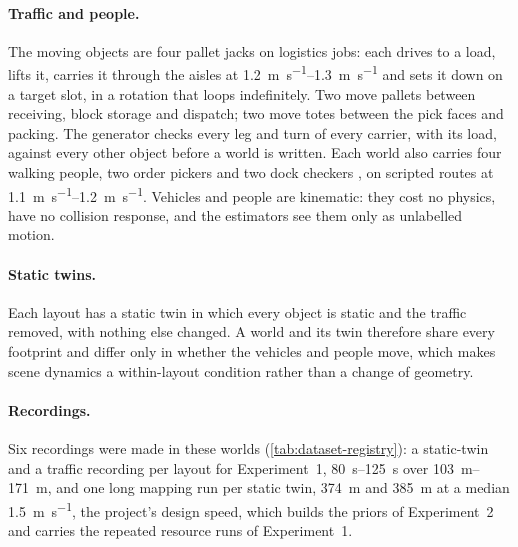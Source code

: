 \paragraph{Traffic and people.} The moving objects are four pallet jacks on
logistics jobs: each drives to a load, lifts it, carries it through the aisles
at \SIrange{1.2}{1.3}{\metre\per\second} and sets it down on a target slot,
in a rotation that loops indefinitely. Two move pallets between receiving,
block storage and dispatch; two move totes between the pick faces and packing.
The generator checks every leg and turn of every carrier, with its load,
against every other object before a world is written. Each world also carries
four walking people, two order pickers and two dock checkers
\cite{mir2024eaton}, on scripted routes at \SIrange{1.1}{1.2}{\metre\per\second}.
Vehicles and people are kinematic: they cost no physics, have no collision
response, and the estimators see them only as unlabelled motion.

\paragraph{Static twins.} Each layout has a static twin in which every object
is static and the traffic removed, with nothing else changed. A world and its
twin therefore share every footprint and differ only in whether the vehicles
and people move, which makes scene dynamics a within-layout condition rather
than a change of geometry.

\paragraph{Recordings.} Six recordings were made in these worlds
(\cref{tab:dataset-registry}): a static-twin and a traffic recording per layout
for Experiment~1, \SIrange{80}{125}{\second} over
\SIrange{103}{171}{\metre}, and one long mapping run per static twin,
\SI{374}{\metre} and \SI{385}{\metre} at a median
\SI{1.5}{\metre\per\second}, the project's design speed, which builds the
priors of Experiment~2 and carries the repeated resource runs of
Experiment~1.
